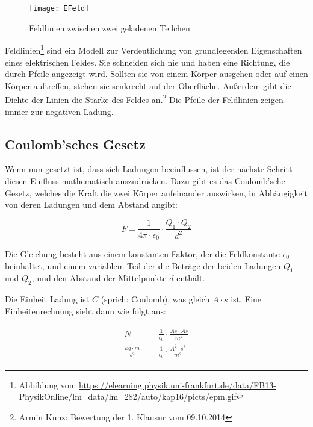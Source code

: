 \begin{figure}
	\centering
	\texttt{[image: EFeld]}
	\caption{Feldlinien zwischen zwei geladenen Teilchen}
\end{figure}

Feldlinien\footnote{Abbildung von: \url{https://elearning.physik.uni-frankfurt.de/data/FB13-PhysikOnline/lm_data/lm_282/auto/kap16/picts/epm.gif}} sind ein Modell zur Verdeutlichung von grundlegenden Eigenschaften eines elektrischen Feldes. Sie schneiden sich nie und haben eine Richtung, die durch Pfeile angezeigt wird. Sollten sie von einem Körper ausgehen oder auf einen Körper auftreffen, stehen sie senkrecht auf der Oberfläche. Außerdem gibt die Dichte der Linien die Stärke des Feldes an.\footnote{Armin Kunz: Bewertung der 1. Klausur vom 09.10.2014} Die Pfeile der Feldlinien zeigen immer zur negativen Ladung.


\subsection{Coulomb'sches Gesetz}

Wenn nun gesetzt ist, dass sich Ladungen beeinflussen, ist der nächste Schritt diesen \glqq Einfluss\grqq{} mathematisch auszudrücken. Dazu gibt es das Coulomb'sche Gesetz, welches die Kraft die zwei Körper aufeinander auswirken, in Abhängigkeit von deren Ladungen und dem Abstand angibt:

\begin{equation}\label{eq:coulomb_gesetz}
	F = \frac{1}{4\pi \cdot \epsilon_0} \cdot \frac{Q_1 \cdot Q_2}{d^{2}}
\end{equation}

Die Gleichung besteht aus einem konstanten Faktor, der die Feldkonstante $\epsilon_0$ beinhaltet, und einem variablem Teil der die Beträge der beiden Ladungen $Q_1$ und $Q_2$, und den Abstand der Mittelpunkte $d$ enthält.

Die Einheit Ladung ist $C$ (sprich: Coulomb), was gleich $A \cdot s$ ist. Eine Einheitenrechnung sieht dann wie folgt aus:

\begin{align}\label{eq:coulomb_gesetz_einheiten}
\begin{split}
	N 							&= \frac{1}{\epsilon_0} \cdot \frac{As \cdot As}{m^{2}} \\
	\frac{kg \cdot m}{s^{2}} 	&= \frac{1}{\epsilon_0} \cdot \frac{A^{2} \cdot s^{2}}{m^{2}}
\end{split}
\end{align}

